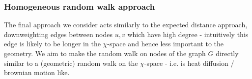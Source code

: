 


\subsubsection{Homogeneous random walk approach}
The final approach we consider acts similarly to the expected distance approach, downweighting edges between nodes $u, v$ which have high degree - intuitively this edge is likely to be longer in the $\chi$-space and hence less important to the geometry. We aim to make the random walk on nodes of the graph $G$ directly similar to a (geometric) random walk on the $\chi$-space - i.e. is heat diffusion / brownian motion like.

